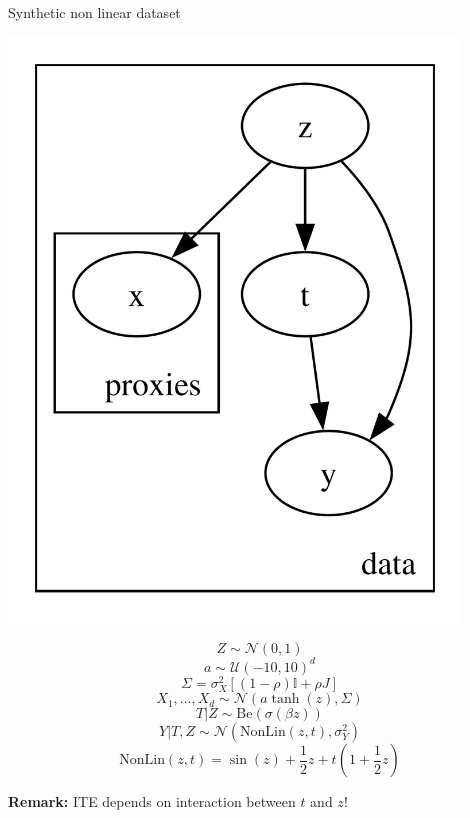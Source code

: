 \documentclass[10pt]{beamer}
\begin{document}
\begin{frame}{Synthetic non linear dataset}
    \begin{minipage}{0.48\textwidth}
    \includegraphics[width=0.9\textwidth]{images/pyro_model.pdf}
    \end{minipage}
    \begin{minipage}{0.48\textwidth}
    
        \begin{equation*}
        Z \sim \mathcal{N}(0,1)
        \end{equation*}
        \begin{equation*}
            a \sim \mathcal{U}(-10,10)^d
        \end{equation*}
        \begin{equation*}
        \Sigma=\sigma_X^2[(1-\rho) \mathbb{I}+\rho J]    
        \end{equation*}
        \begin{equation*}
        X_1,...,X_d \sim \mathcal{N}(a\tanh(z),\Sigma)     
        \end{equation*}
        \begin{equation*}
        T | Z \sim \text{Be}(\sigma(\beta z))    
        \end{equation*}
        \begin{equation*}
        Y|T,Z \sim \mathcal{N}\left(\text{NonLin}(z,t),\sigma_Y^2\right)           
        \end{equation*}
        \begin{equation*}
        \text{NonLin}(z,t) = \sin(z)+\frac12z+t\left(1+\frac12z\right)      
        \end{equation*}
    \end{minipage}
    \centering
    {\textbf{Remark:} ITE depends on interaction between $t$ and $z$!}
\end{frame}
\end{document}
